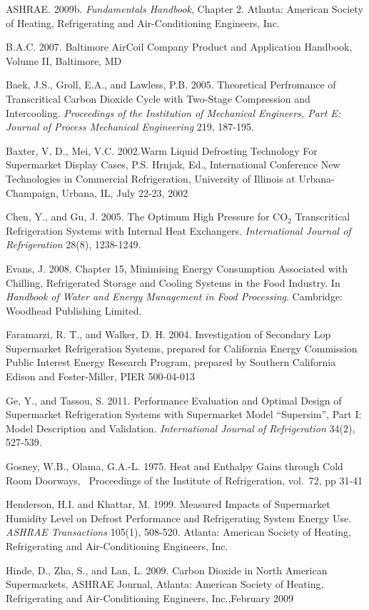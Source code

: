 ASHRAE. 2009b. \emph{Fundamentals Handbook}, Chapter 2. Atlanta: American Society of Heating, Refrigerating and Air-Conditioning Engineers, Inc.

B.A.C. 2007. Baltimore AirCoil Company Product and Application Handbook, Volume II, Baltimore, MD

Baek, J.S., Groll, E.A., and Lawless, P.B. 2005. Theoretical Perfromance of Transcritical Carbon Dioxide Cycle with Two-Stage Compression and Intercooling. \emph{Proceedings of the Institution of Mechanical Engineers, Part E: Journal of Process Mechanical Engineering} 219, 187-195.

Baxter, V. D., Mei, V.C. 2002.Warm Liquid Defrosting Technology For Supermarket Display Cases, P.S. Hrnjak, Ed., International Conference New Technologies in Commercial Refrigeration, University of Illinois at Urbana-Champaign, Urbana, IL, July 22-23, 2002

Chen, Y., and Gu, J. 2005. The Optimum High Pressure for CO\(_{2}\) Transcritical Refrigeration Systems with Internal Heat Exchangers. \emph{International Journal of Refrigeration} 28(8), 1238-1249.

Evans, J. 2008. Chapter 15, Minimising Energy Consumption Associated with Chilling, Refrigerated Storage and Cooling Systems in the Food Industry. In \emph{Handbook of Water and Energy Management in Food Processing}. Cambridge:~ Woodhead Publishing Limited.

Faramarzi, R. T., and Walker, D. H. 2004. Investigation of Secondary Lop Supermarket Refrigeration Systems, prepared for California Energy Commission Public Interest Energy Research Program, prepared by Southern California Edison and Foster-Miller, PIER 500-04-013

Ge, Y., and Tassou, S. 2011. Performance Evaluation and Optimal Design of Supermarket Refrigeration Systems with Supermarket Model ``Supersim'', Part I: Model Description and Validation. \emph{International Journal of Refrigeration} 34(2), 527-539.

Gosney, W.B., Olama, G.A.-L. 1975. Heat and Enthalpy Gains through Cold Room Doorways,~ Proceedings of the Institute of Refrigeration, vol.~72, pp 31-41

Henderson, H.I. and Khattar, M. 1999. Measured Impacts of Supermarket Humidity Level on Defrost Performance and Refrigerating System Energy Use. \emph{ASHRAE Transactions} 105(1), 508-520. Atlanta: American Society of Heating, Refrigerating and Air-Conditioning Engineers, Inc.

Hinde, D., Zha, S., and Lan, L. 2009. Carbon Dioxide in North American Supermarkets, ASHRAE Journal, Atlanta: American Society of Heating, Refrigerating and Air-Conditioning Engineers, Inc.,February 2009

